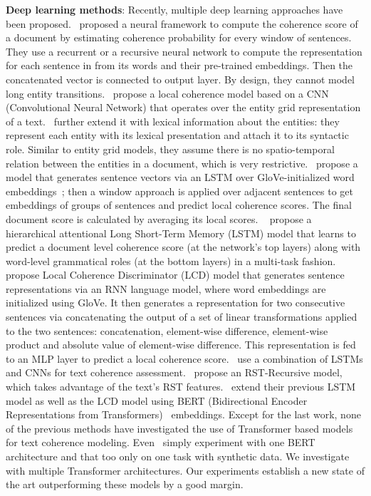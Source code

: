 \documentclass[11pt]{article}
\begin{document}
\noindent\textbf{Deep learning methods}: Recently, multiple deep learning approaches have been proposed.~\cite{li2014model} proposed a neural framework to compute the coherence score of a document by estimating coherence probability for every window of  sentences. They use a recurrent or a recursive neural network to compute the representation for each sentence in  from its words and their pre-trained embeddings. Then the concatenated vector is connected to output layer. By design, they cannot model long entity transitions.~\cite{nguyen2017neural} propose a local coherence model based on a CNN (Convolutional Neural Network) that operates over the entity grid representation of a text.~\cite{mohiuddin2018coherence} further extend it with lexical information about the entities: they represent each entity with its lexical presentation and attach it to its syntactic role. Similar to entity grid models, they assume there is no spatio-temporal relation between the entities in a document, which is very restrictive.~\cite{li2017neural} propose a model that generates sentence vectors via an LSTM over GloVe-initialized word embeddings~\cite{pennington2014glove}; then a window approach is applied over adjacent sentences to get embeddings of groups of sentences and predict local coherence scores. The final document score is calculated by averaging its local scores. 
~\cite{farag2019multi} propose a hierarchical attentional Long Short-Term Memory (LSTM) model that learns to predict a document level coherence score (at the network’s top layers) along with word-level grammatical roles (at the bottom layers) in a multi-task fashion. 
~\cite{xu2019cross} propose Local Coherence Discriminator (LCD) model that generates sentence representations via an RNN language model, where word embeddings are initialized using GloVe. It then generates a representation for two consecutive sentences via concatenating the output of a set of linear transformations applied to the two sentences: concatenation, element-wise difference, element-wise product and absolute value of element-wise difference. This representation is fed to an MLP layer to predict a local coherence score.~\cite{moon2019unified} use a combination of LSTMs and CNNs for text coherence assessment.~\cite{guz2020neural} propose an RST-Recursive model, which takes advantage of the text's RST features.~\cite{farag2020analyzing} extend their previous LSTM model as well as the LCD model using BERT (Bidirectional Encoder Representations from Transformers)~\cite{devlin2018bert} embeddings. Except for the last work, none of the previous methods have investigated the use of Transformer based models for text coherence modeling. Even~\cite{farag2020analyzing} simply experiment with one BERT architecture and that too only on one task with synthetic data. We investigate with multiple Transformer architectures. Our experiments establish a new state of the art outperforming these models by a good margin.
\fi
\end{document}
